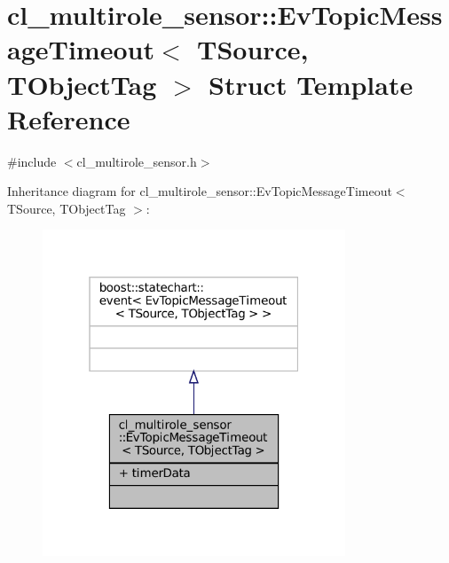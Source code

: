 \hypertarget{structcl__multirole__sensor_1_1EvTopicMessageTimeout}{}\section{cl\+\_\+multirole\+\_\+sensor\+:\+:Ev\+Topic\+Message\+Timeout$<$ T\+Source, T\+Object\+Tag $>$ Struct Template Reference}
\label{structcl__multirole__sensor_1_1EvTopicMessageTimeout}


{\ttfamily \#include $<$cl\+\_\+multirole\+\_\+sensor.\+h$>$}



Inheritance diagram for cl\+\_\+multirole\+\_\+sensor\+:\+:Ev\+Topic\+Message\+Timeout$<$ T\+Source, T\+Object\+Tag $>$\+:
\nopagebreak
\begin{figure}[H]
\begin{center}
\leavevmode
\includegraphics[width=256pt]{structcl__multirole__sensor_1_1EvTopicMessageTimeout__inherit__graph}
\end{center}
\end{figure}


